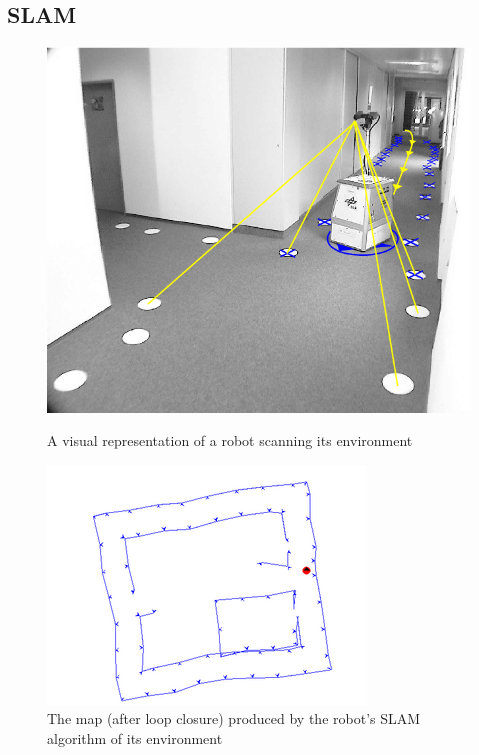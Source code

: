 \documentclass[12pt]{article}
\begin{document}
\subsection{SLAM}

\begin{figure}[h]
    \centering
    \begin{minipage}{0.45\textwidth}
        \centering
        \includegraphics[width=\linewidth]{SLAM_agent} %
        \caption[Short caption]{A visual representation of a robot scanning its environment \cite{SLAM_overview}}
        \label{fig:SLAM_agent}
    \end{minipage}\hfill
    \begin{minipage}{0.45\textwidth}
        \centering
        \includegraphics[width=\linewidth]{SLAM_map} %
        \caption[Short caption]{The map (after loop closure) produced by the robot's SLAM algorithm of its environment \cite{SLAM_overview}}
        \label{fig:SLAM_map}
    \end{minipage}
\end{figure}
\end{document}
